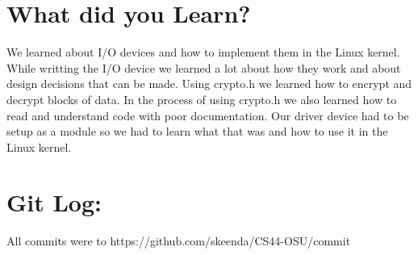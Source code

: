 \documentclass[10pt,drafclsnofoot,onecolumn]{article}
\begin{document}
\section{What did you Learn?}
We learned about I/O devices and how to implement them in the Linux kernel.
While writting the I/O device we learned a lot about how they work and about design decisions that can be made.
Using crypto.h we learned how to encrypt and decrypt blocks of data.
In the process of using crypto.h we also learned how to read and understand code with poor documentation.
Our driver device had to be setup as a module so we had to learn what that was and how to use it in the Linux kernel.

\section{Git Log:}
All commits were to https://github.com/skeenda/CS44-OSU/commit\\
\\
\end{document}
